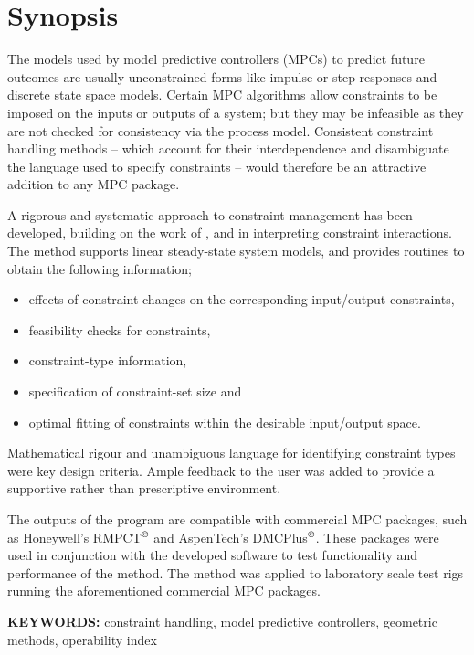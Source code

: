 \chapter*{Synopsis}
The models used by model predictive controllers (MPCs) to predict future outcomes are usually unconstrained forms like impulse or step responses and discrete state space models. 
Certain MPC algorithms allow constraints  to be imposed on the inputs or outputs of a system; but they may be infeasible as they are not checked for consistency via the process model. 
Consistent constraint handling methods -- which account for their interdependence and disambiguate the language used to specify constraints -- would therefore be an attractive addition to any MPC package.

A rigorous and systematic approach to constraint management has been developed, building on the work of \citet{vinsonphd}, \citet{limaphd} and \citet{opconproc} in interpreting constraint interactions. 
The method supports linear steady-state system models, and provides routines to obtain the following information;
\begin{itemize}
  \item effects of constraint changes on the corresponding input/output constraints,
  \item feasibility checks for constraints,
  \item constraint-type information,
  \item specification of constraint-set size and
  \item optimal fitting of constraints within the desirable input/output space.
\end{itemize}
Mathematical rigour and unambiguous language for identifying constraint types were key design criteria. 
Ample feedback to the user was added to provide a supportive rather than prescriptive environment.

The outputs of the program are compatible with commercial MPC packages, such as Honeywell's RMPCT$^{\copyright}$ and AspenTech's DMCPlus$^{\copyright}$.
These packages were used in conjunction with the developed software to test functionality and performance of the method.
The method was applied to laboratory scale test rigs running the aforementioned commercial MPC packages.
\bigskip

\noindent \textbf{KEYWORDS:} constraint handling, model predictive
controllers, geometric methods, operability index


